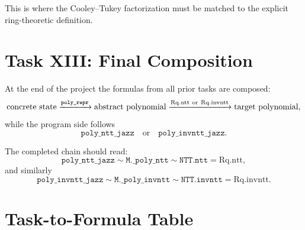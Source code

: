 \documentclass[11pt]{article}
\newcommand{\code}[1]{\text{\texttt{#1}}}
\begin{document}
This is where the Cooley--Tukey factorization must be matched to the explicit
ring-theoretic definition.

\section{Task XIII: Final Composition}

At the end of the project the formulas from all prior tasks are composed:
\[
\text{concrete state}
\xrightarrow{\code{poly\_repr}}
\text{abstract polynomial}
\xrightarrow{\mathrm{Rq.ntt}\ \text{or}\ \mathrm{Rq.invntt}}
\text{target polynomial},
\]
while the program side follows
\[
\texttt{poly\_ntt\_jazz}
\quad\text{or}\quad
\texttt{poly\_invntt\_jazz}.
\]

The completed chain should read:
\[
\texttt{poly\_ntt\_jazz}
\sim
\texttt{M.\_poly\_ntt}
\sim
\texttt{NTT.ntt}
=
\mathrm{Rq.ntt},
\]
and similarly
\[
\texttt{poly\_invntt\_jazz}
\sim
\texttt{M.\_poly\_invntt}
\sim
\texttt{NTT.invntt}
=
\mathrm{Rq.invntt}.
\]

\section{Task-to-Formula Table}
\end{document}
